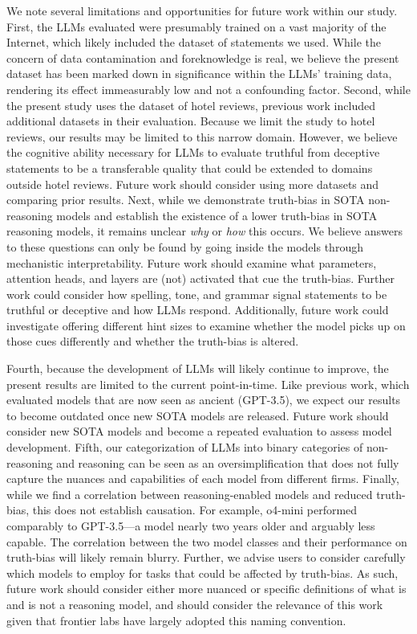 \documentclass{article}
\begin{document}
We note several limitations and opportunities for future work within our study. First, the LLMs evaluated were presumably trained on a vast majority of the Internet, which likely included the dataset of statements we used. While the concern of data contamination and foreknowledge is real, we believe the present dataset has been marked down in significance within the LLMs' training data, rendering its effect immeasurably low and not a confounding factor. Second, while the present study uses the dataset of hotel reviews, previous work \citep{markowitz_generative_2024} included additional datasets in their evaluation. Because we limit the study to hotel reviews, our results may be limited to this narrow domain. However, we believe the cognitive ability necessary for LLMs to evaluate truthful from deceptive statements to be a transferable quality that could be extended to domains outside hotel reviews. Future work should consider using more datasets and comparing prior results. Next, while we demonstrate truth-bias in SOTA non-reasoning models and establish the existence of a lower truth-bias in SOTA reasoning models, it remains unclear \textit{why} or \textit{how} this occurs. We believe answers to these questions can only be found by going inside the models through mechanistic interpretability. Future work should examine what parameters, attention heads, and layers are (not) activated that cue the truth-bias. Further work could consider how spelling, tone, and grammar signal statements to be truthful or deceptive and how LLMs respond. Additionally, future work could investigate offering different hint sizes to examine whether the model picks up on those cues differently and whether the truth-bias is altered.

Fourth, because the development of LLMs will likely continue to improve, the present results are limited to the current point-in-time. Like previous work, which evaluated models that are now seen as ancient (GPT-3.5), we expect our results to become outdated once new SOTA models are released. Future work should consider new SOTA models and become a repeated evaluation to assess model development. Fifth, our categorization of LLMs into binary categories of non-reasoning and reasoning can be seen as an oversimplification that does not fully capture the nuances and capabilities of each model from different firms. Finally, while we find a correlation between reasoning-enabled models and reduced truth-bias, this does not establish causation. For example, o4-mini performed comparably to GPT-3.5---a model nearly two years older and arguably less capable. The correlation between the two model classes and their performance on truth-bias will likely remain blurry. Further, we advise users to consider carefully which models to employ for tasks that could be affected by truth-bias. As such, future work should consider either more nuanced or specific definitions of what is and is not a reasoning model, and should consider the relevance of this work given that frontier labs have largely adopted this naming convention.
\end{document}

